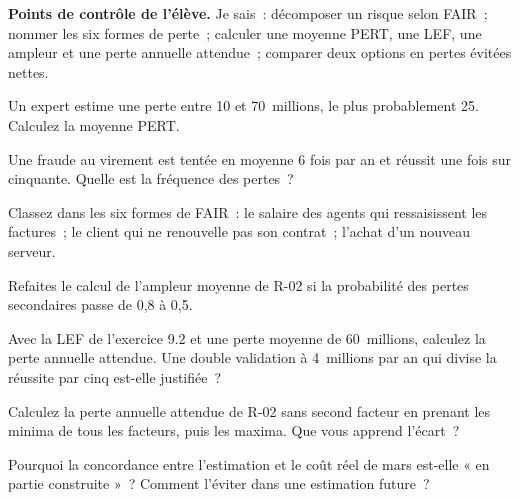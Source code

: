 \begin{boxinfo}
\textbf{Points de contrôle de l'élève.} Je sais~: décomposer un risque
selon FAIR~; nommer les six formes de perte~; calculer une moyenne PERT, une
LEF, une ampleur et une perte annuelle attendue~; comparer deux options en
pertes évitées nettes.
\end{boxinfo}

\bigskip

\begin{boxexo}[title={\ding{45}\quad Exercice~9.1. PERT \niveaubase}]
Un expert estime une perte entre 10 et 70~millions, le plus probablement
25. Calculez la moyenne PERT.
\end{boxexo}

\begin{boxexo}[title={\ding{45}\quad Exercice~9.2. LEF \niveaubase}]
Une fraude au virement est tentée en moyenne 6 fois par an et réussit
une fois sur cinquante. Quelle est la fréquence des pertes~?
\end{boxexo}

\begin{boxexo}[title={\ding{45}\quad Exercice~9.3. Formes de perte \niveaubase}]
Classez dans les six formes de FAIR~: le salaire des agents qui ressaisissent
les factures~; le client qui ne renouvelle pas son contrat~; l'achat d'un
nouveau serveur.
\end{boxexo}

\begin{boxexo}[title={\ding{45}\quad Exercice~9.4. Ampleur \niveaumoyen}]
Refaites le calcul de l'ampleur moyenne de R-02 si la probabilité des
pertes secondaires passe de 0,8 à 0,5.
\end{boxexo}

\begin{boxexo}[title={\ding{45}\quad Exercice~9.5. La fraude \niveaumoyen}]
Avec la LEF de l'exercice 9.2 et une perte moyenne de 60~millions,
calculez la perte annuelle attendue. Une double validation à 4~millions
par an qui divise la réussite par cinq est-elle justifiée~?
\end{boxexo}

\begin{boxexo}[title={\ding{45}\quad Exercice~9.6. Les bornes \niveaumoyen}]
Calculez la perte annuelle attendue de R-02 sans second facteur en
prenant les minima de tous les facteurs, puis les maxima. Que vous
apprend l'écart~?
\end{boxexo}

\begin{boxexo}[title={\ding{45}\quad Exercice~9.7. Construite \niveaumoyen}]
Pourquoi la concordance entre l'estimation et le coût réel de mars est-elle
« en partie construite »~? Comment l'éviter dans une estimation future~?
\end{boxexo}

